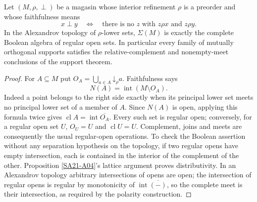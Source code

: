 \begin{proposition}
\label{SA21-A12}
Let $(M,\rho,\perp)$ be a magasin whose interior refinement $\rho$ is
a preorder and whose faithfulness means
\[
 x\perp y\quad\Longleftrightarrow\quad
 \text{there is no }z\text{ with }z\rho x\text{ and }z\rho y.
\]
In the Alexandrov topology of $\rho$-lower sets,
$\Sigma(M)$ is exactly the complete Boolean algebra of regular open
sets. In particular every family of mutually orthogonal supports
satisfies the relative-complement and nonempty-meet conclusions of
the support theorem.
\end{proposition}
\begin{proof}
For $A\subseteq M$ put $O_A=\bigcup_{a\in A}\mathord\downarrow_\rho a$.
Faithfulness says
\[
 N(A)=\operatorname{int}(M\setminus O_A).
\]
Indeed a point belongs to the right side exactly when its principal
lower set meets no principal lower set of a member of $A$.
Since $N(A)$ is open, applying this formula twice gives
$\operatorname{cl}A=\operatorname{int}\overline{O_A}$.
Every such set is regular open; conversely, for a regular open set
$U$, $O_U=U$ and $\operatorname{cl}U=U$. Complement, joins and meets
are consequently the usual regular-open operations. To check the
Boolean assertion without any separation hypothesis on the topology,
if two regular opens have empty intersection, each is contained in
the interior of the complement of the other. Proposition
\ref{SA21-A04}'s lattice argument proves distributivity. In an
Alexandrov topology arbitrary intersections of opens are open; the
intersection of regular opens is regular by monotonicity of
$\operatorname{int}\overline{(-)}$, so the complete meet is their
intersection, as required by the polarity construction.
\end{proof}

